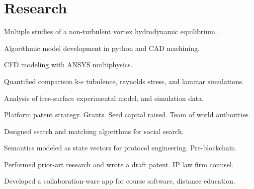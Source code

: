 \documentclass[letterpaper]{deedy-resume} %
\begin{document}
\hfill
\begin{minipage}[t]{1\textwidth} %


\section{Research}




Multiple studies of a non-turbulent vortex hydrodynamic equilibrium.

\vspace{\topsep} %
\begin{tightitemize}
\item Algorithmic model development in python and CAD machining. 
\item CFD modeling with ANSYS multiphysics. 
\item Quantified comparison k-$\epsilon$ tubulence, reynolds stress, and laminar simulations.
\item Analysis of free-surface experimental model, and simulation data.
\item Platform patent strategy.  Grants. Seed capital raised. Team of world authorities.
\end{tightitemize}

\sectionspace %



\begin{tightitemize}
\item Designed search and matching algorithms for social search.
\item Semantics modeled as state vectors for protocol engineering.  Pre-blockchain.
\item Performed prior-art research and wrote a draft patent. IP law firm counsel.
\item Developed a collaboration-ware app for course software, distance education.
\end{tightitemize}


\end{minipage}
\end{document}
